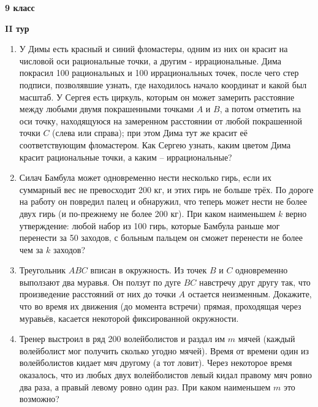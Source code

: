\documentclass{article}
\begin{document}
\large
	
\begin{center}
	\LARGE\textbf{9 класс}
\end{center}
\begin{center}
	\large\textbf{II тур}
\end{center}

\begin{enumerate}[label*=\textbf{\arabic{enumi}.}]
\setcounter{enumi}{0}
\item У Димы есть красный и синий фломастеры, одним из них он красит на числовой оси рациональные точки, а другим - иррациональные. Дима покрасил 100 рациональных и 100 иррациональных точек, после чего стер подписи, позволявшие узнать, где находилось начало координат и какой был масштаб. У Сергея есть циркуль, которым он может замерить расстояние между любыми двумя покрашенными точками $A$ и $B$, а потом отметить на оси точку, находящуюся на замеренном расстоянии от любой покрашенной точки $C$ (слева или справа); при этом Дима тут же красит её соответствующим фломастером. Как Сергею узнать, каким цветом Дима красит рациональные точки, а каким -- иррациональные?

\item Силач Бамбула может одновременно нести несколько гирь, если их суммарный вес не превосходит 200 кг, и этих гирь не больше трёх. По дороге на работу он повредил палец и обнаружил, что теперь может нести не более двух гирь (и по-прежнему не более 200 кг). При каком наименьшем $k$ верно утверждение: любой набор из 100 гирь, которые Бамбула раньше мог перенести за 50 заходов, с больным пальцем он сможет перенести не более чем за $k$ заходов?

\item Треугольник $ABC$ вписан в окружность. Из точек $B$ и $C$ одновременно выползают два муравья. Он ползут по дуге $BC$ навстречу друг другу так, что произведение расстояний от них до точки $A$ остается неизменным. Докажите, что во время их движения (до момента встречи) прямая, проходящая через муравьёв, касается некоторой фиксированной окружности.

\item Тренер выстроил в ряд 200 волейболистов и раздал им $m$ мячей (каждый волейболист мог получить сколько угодно мячей). Время от времени один из волейболистов кидает мяч другому (а тот ловит). Через некоторое время оказалось, что из любых двух волейболистов левый кидал правому мяч ровно два раза, а правый левому ровно один раз. При каком наименьшем $m$ это возможно?


\end{enumerate}
\end{document}
